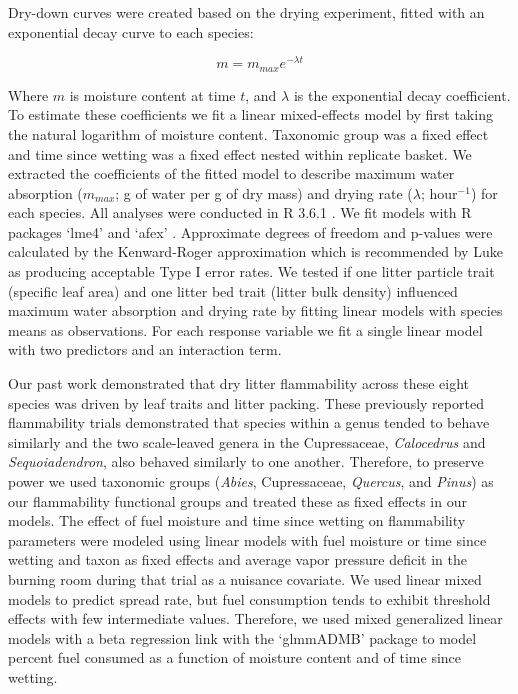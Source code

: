 \documentclass[letterpaper,12pt]{article}
\begin{document}
Dry-down curves were created based on the drying experiment, fitted with an
exponential decay curve to each species:

\begin{equation}
m = m_{max} e^{-\lambda t}
\end{equation}

Where $m$ is moisture content at time $t$, and $\lambda$ is the exponential
decay coefficient. To estimate these coefficients we fit a linear mixed-effects
model by first taking the natural logarithm of moisture content. Taxonomic
group was a fixed effect and time since wetting was a fixed effect nested
within replicate basket. We extracted the coefficients of the fitted model to
describe maximum water absorption ($m_{max}$; g of water per g of dry mass) and
drying rate ($\lambda$; hour$^{-1}$) for each species. All analyses were
conducted in R 3.6.1 \citep{RCoreTeam-2019}. We fit models with R packages
`lme4' \citep{Bates_Machler_etal-2015} and `afex'
\citep{Singmann_Bolker_etal-2017}. Approximate degrees of freedom and p-values
were calculated by the Kenward-Roger approximation \citep{Kenward_Roger-1997}
which is recommended by Luke \citeyear{Luke-2017} as producing acceptable Type
I error rates. We tested if one litter particle trait (specific leaf area) and
one litter bed trait (litter bulk density) influenced maximum water absorption
and drying rate by fitting linear models with species means as observations.
For each response variable we fit a single linear model with two predictors and
an interaction term.

Our past work \citep{Magalhaes+Schwilk-2012} demonstrated that dry litter
flammability across these eight species was driven by leaf traits and litter
packing. These previously reported flammability trials demonstrated that
species within a genus tended to behave similarly and the two scale-leaved
genera in the Cupressaceae, \emph{Calocedrus} and \emph{Sequoiadendron}, also
behaved similarly to one another. Therefore, to preserve power we used
taxonomic groups (\emph{Abies}, Cupressaceae, \emph{Quercus}, and \emph{Pinus})
as our flammability functional groups and treated these as fixed effects in our
models. The effect of fuel moisture and time since wetting on flammability
parameters were modeled using linear models with fuel moisture or time since
wetting and taxon as fixed effects and average vapor pressure deficit in the
burning room during that trial as a nuisance covariate. We used linear mixed
models to predict spread rate, but fuel consumption tends to exhibit threshold
effects with few intermediate values. Therefore, we used mixed generalized
linear models with a beta regression link with the `glmmADMB' package
\citep{Skaug_Fournier_etal-2016} to model percent fuel consumed as a function
of moisture content and of time since wetting.
\end{document}
